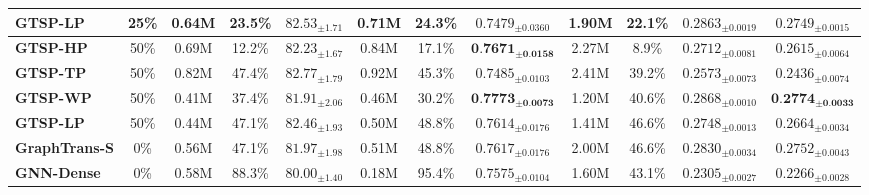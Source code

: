 \documentclass[letterpaper]{article} %
\begin{document}
\begin{table}[!t]
{\begin{tabular}{@{}l|c|ccc|ccc|cccc@{}}
\text{\Large \textcolor{myorange}{$\bullet$}} \textbf{GTSP-LP}                  & 25\%                      & 0.64M         & 23.5\%                & $82.53_{ \pm 1.71}$ &   0.71M       &   24.3\%              & $0.7479_{ \pm 0.0360}$ & 1.90M    & 22.1\%          & $0.2863_{ \pm 0.0019}$ & $0.2749_{ \pm 0.0015}$ \\ \midrule
\text{\Large \textcolor{myblue}{$\bullet$}}  \textbf{GTSP-HP}                  & 50\%                      & 0.69M          &   12.2\%              & $82.23_{ \pm 1.67}$ &   0.84M       & 17.1\%                 & $\textbf{0.7671}_{ \pm \textbf{0.0158}}$ & 2.27M    & 8.9\%          & $0.2712_{ \pm 0.0081}$ & $0.2615_{ \pm 0.0064}$ \\
\text{\Large \textcolor{myred}{$\bullet$}} \textbf{GTSP-TP}                  & 50\%                      &  0.82M        &   47.4\%               & $82.77_{ \pm 1.79}$ &   0.92M       & 45.3\%             & $0.7485_{ \pm 0.0103}$ & 2.41M    & 39.2\%          & $0.2573_{ \pm 0.0073}$ & $0.2436_{ \pm 0.0074}$ \\
\text{\Large \textcolor{mygreen}{$\bullet$}} \textbf{GTSP-WP}                  & 50\%                      &  0.41M        & 37.4\%                & $81.91 _{ \pm 2.06}$ & 0.46M         & 30.2\%                & $\textbf{0.7773}_{ \pm \textbf{0.0073}}$ & 1.20M    & 40.6\%          & $0.2868_{ \pm 0.0010}$ & $\textbf{0.2774}_{ \pm \textbf{0.0033}}$ \\
\text{\Large \textcolor{myorange}{$\bullet$}} \textbf{GTSP-LP}                 & 50\%                      & 0.44M       &  47.1\%               & $82.46_{ \pm 1.93}$ &  0.50M       & 48.8\%             & $0.7614_{ \pm 0.0176}$ & 1.41M    & 46.6\%          & $0.2748_{ \pm 0.0013}$ & $0.2664_{ \pm 0.0034}$  \\ \midrule
 \textbf{GraphTrans-S}        & 0\%                       &  0.56M         &  47.1\%              & $81.97_{ \pm 1.98}$ &   0.51M       &   48.8\%                & $0.7617_{ \pm 0.0176}$ & 2.00M    & 46.6\%          & $0.2830_{ \pm 0.0034}$ & $0.2752_{ \pm 0.0043}$ \\
 \textbf{GNN-Dense }              & 0\%                       & 0.58M         &  88.3\%              & $80.00_{ \pm 1.40}$ & 0.18M        &   95.4\%              & $0.7575_{ \pm 0.0104}$ & 1.60M    & 43.1\%          & $0.2305_{ \pm 0.0027}$ & $0.2266_{ \pm 0.0028}$ \\ \bottomrule
\end{tabular}%
}
\end{table}
\end{document}
